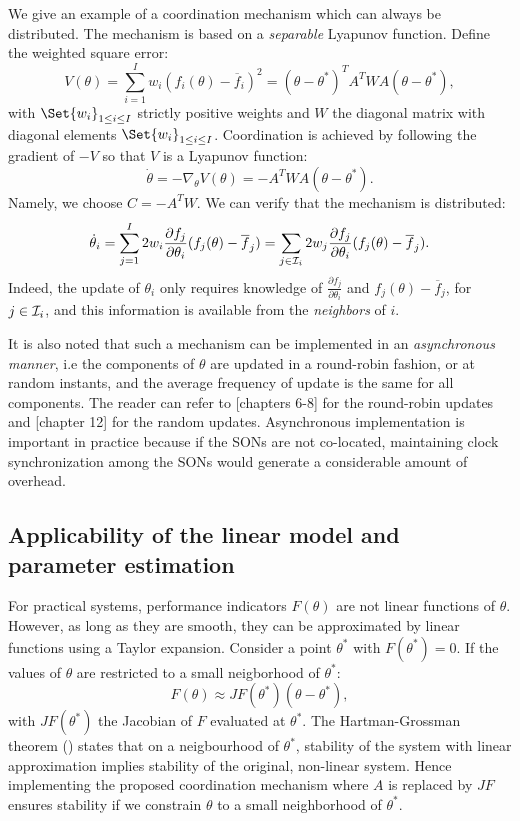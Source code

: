 \documentclass[10pt,conference,letterpaper]{IEEEtran}
\begin{document}
	We give an example of a coordination mechanism which can always be distributed. The mechanism is based on a \emph{separable} Lyapunov function. Define the weighted square error:
\begin{equation}
	V(\theta) = \sum_{i=1}^I w_i (f_i(\theta) - \overline{f}_i)^2 = (\theta - \theta^*)^T A^T W A (\theta - \theta^*),
\end{equation}
with $\Set{w_i}_{1 \leq i \leq I}$ strictly positive weights and $W$ the diagonal matrix with diagonal elements $\Set{w_i}_{1 \leq i \leq I}$.
	Coordination is achieved by following the gradient of $-V$ so that $V$ is a Lyapunov function:
\begin{equation}
	\dot{\theta} = - \nabla_{\theta} V(\theta) =  - A^T W A (\theta - \theta^*).
\end{equation}
	Namely, we choose $C = - A^T W$. We can verify that the mechanism is distributed:
\begin{equation}
	\dot{\theta}_i =  \sum_{j=1}^I  2 w_i  \frac{\partial f_j}{\partial \theta_i}  (  f_j(\theta) - \overline{f}_j ) =  \sum_{j \in {\cal I}_i} 2 w_j  \frac{\partial  f_j}{\partial  \theta_i}  (  f_j(\theta) - \overline{f}_j ).
\end{equation}
	Indeed, the update of $\theta_i$ only requires knowledge of $\frac{\partial f_j}{\partial \theta_i}$ and $f_j(\theta) - \overline{f}_j$, for $j \in {\cal I}_i$, and this information is available from the \emph{neighbors} of $i$.
	
	It is also noted that such a mechanism can be implemented in an \emph{asynchronous manner}, i.e the components of $\theta$ are updated in a round-robin fashion, or at random instants, and the average frequency of update is the same for all components. The reader can refer to \cite{Bertsekas}[chapters 6-8] for the round-robin updates  and \cite{Kushner}[chapter 12] for the random updates. Asynchronous implementation is important in practice because if the \acp{SON} are not co-located, maintaining clock synchronization among the \acp{SON} would generate a considerable amount of overhead.
\subsection{Applicability of the linear model and parameter estimation}
	For practical systems, performance indicators $F(\theta)$ are not linear functions of $\theta$. However, as long as they are smooth, they can be approximated by linear functions using a Taylor expansion. Consider a point $\theta^*$ with $F(\theta^*) = 0$. If the values of $\theta$ are restricted to a small neigborhood of $\theta^*$:
\begin{equation} 
	F(\theta) \approx J F(\theta^*) (\theta - \theta^*),
\end{equation}
with $J F(\theta^*)$ the Jacobian of $F$ evaluated at $\theta^*$. The Hartman-Grossman theorem (\cite{HartmanGrossman}) states that on a neigbourhood of $\theta^*$, stability of the system with linear approximation implies stability of the original, non-linear system. Hence implementing the proposed coordination mechanism where $A$ is replaced by $J F$ ensures stability if we constrain $\theta$ to a small neighborhood of $\theta^*$.
	
\end{document}
